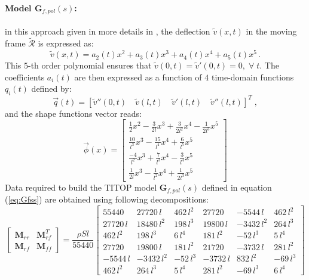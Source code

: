 \documentclass[smallcondensed]{svjour3}     %
\begin{document}
\paragraph{Model $\mathbf{G}_{f,pol}(s)$:} in this approach given in more details in \cite{Murali2015}, the deflection $\widetilde{v}(x,t)$ in the moving frame $\widetilde{\mathcal{R}}$ is expressed as:
\[
\widetilde{v}(x,t)=a_2(t)x^2+a_3(t)x^3+a_4(t)x^4+a_5(t)x^5\,.
\]
This $5$-th order polynomial ensures that $\widetilde{v}(0,t)=\widetilde{v}'(0,t)=0,\;\forall\;t$. The coefficients $a_i(t)$ are then expressed as a function of $4$ time-domain functions $q_i(t)$ defined by:
\begin{equation}\label{eq:defq}
\vec{q}(t)=[\widetilde{v}''(0,t)\quad \widetilde{v}(l,t)\quad \widetilde{v}'(l,t)\quad \widetilde{v}''(l,t)]^T\;,
\end{equation}
and the shape functions vector reads:
\begin{equation}\label{eq:Phi}
  \vec{\phi}(x)=\left[\begin{array}{c}\frac{1}{2}x^2-\frac{3}{2l}x^3+\frac{3}{2l^2}x^4-\frac{1}{2l^3}x^5\\ \frac{10}{l^3}x^3-\frac{15}{l^4}x^4+\frac{6}{l^5}x^5\\
\frac{-4}{l^2}x^3+\frac{7}{l^3}x^4-\frac{3}{l^4}x^5\\
\frac{1}{2l}x^3-\frac{1}{l^2}x^4+\frac{1}{2l^3}x^5\end{array}\right]
\end{equation}
Data required to build the TITOP model $\mathbf{G}_{f,pol}(s)$ defined in equation (\ref{eq:Gfss}) are obtained using following decompositions:
\begin{equation}\label{eq:mass}
\left[\begin{array}{c|c}\mathbf{M}_{rr} & \mathbf{M}_{rf}^T \\\hline \mathbf{M}_{rf} & \mathbf{M}_{ff} \end{array}\right]=\frac{\rho S l}{55440}\left[\begin{array}{cc|cccc}
    55440 & 27720\,l &  462\,l^2 & 27720 & -5544\,l &  462\,l^2\\
         27720\,l& 18480\,l^2 &198\,l^3 &19800\,l &-3432\,l^2 &264\,l^3\\\hline
         462\,l^2 &198\,l^3&   6\,l^4 &  181\,l^2&  -52\,l^3&    5\,l^4\\
         27720&   19800\,l&   181\,l^2&  21720&  -3732\,l &  281\,l^2\\
         -5544\,l& -3432\,l^2& -52\,l^3 &-3732\,l& 832\,l^2 &  -69\,l^3\\
         462\,l^2 &264\,l^3  &  5\,l^4&  281\,l^2 &-69\,l^3  &   6\,l^4
 \end{array}\right]
\end{equation}
\end{document}
